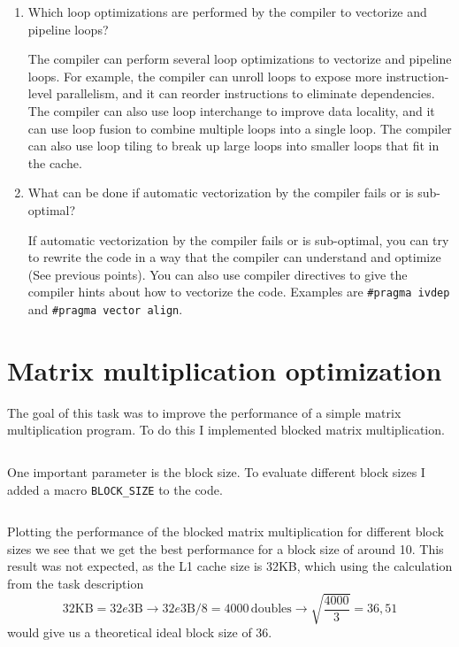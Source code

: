 \documentclass[unicode,11pt,a4paper,oneside,numbers=endperiod,openany]{scrartcl}
\begin{document}
\begin{enumerate}
    \item Which loop optimizations are performed by the compiler to vectorize and pipeline loops?

          The compiler can perform several loop optimizations to vectorize and pipeline loops. For example, the compiler can unroll loops to expose more instruction-level parallelism, and it can reorder instructions to eliminate dependencies. The compiler can also use loop interchange to improve data locality, and it can use loop fusion to combine multiple loops into a single loop. The compiler can also use loop tiling to break up large loops into smaller loops that fit in the cache.

    \item What can be done if automatic vectorization by the compiler fails or is sub-optimal?

          If automatic vectorization by the compiler fails or is sub-optimal, you can try to rewrite the code in a way that the compiler can understand and optimize (See previous points). You can also use compiler directives to give the compiler hints about how to vectorize the code. Examples are \texttt{\#pragma ivdep} and \texttt{\#pragma vector align}.

\end{enumerate}

\section{Matrix multiplication optimization}

The goal of this task was to improve the performance of a simple matrix multiplication program. To do this I implemented blocked matrix multiplication.

\inputminted[firstline=19, lastline=40]{c}{../01b/dgemm-blocked.c}

One important parameter is the block size. To evaluate different block sizes I added a macro \texttt{BLOCK\_SIZE} to the code.

\inputminted[firstline=6, lastline=9]{c}{../01b/dgemm-blocked.c}

Plotting the performance of the blocked matrix multiplication for different block sizes we see that we get the best performance for a block size of around 10. This result was not expected, as the L1 cache size is 32KB, which using the calculation from the task description $$ 32\text{KB} = 32e3\text{B} \rightarrow 32e3\text{B} / 8 = 4000\,\text{doubles} \rightarrow \sqrt{\frac{4000}{3}} = 36,51$$ would give us a theoretical ideal block size of 36.
\end{document}
